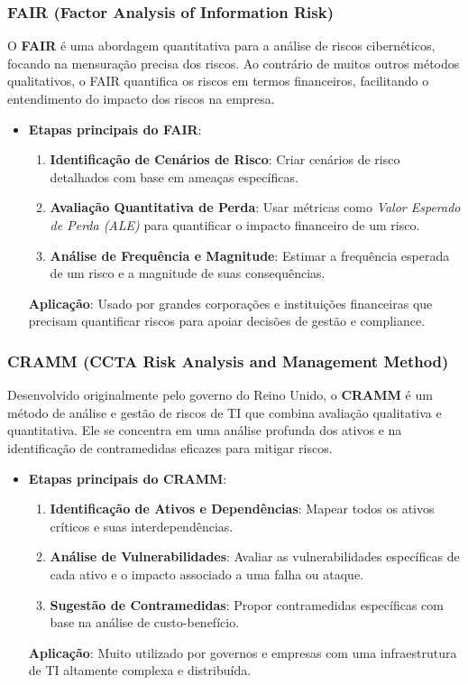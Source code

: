 \documentclass[12pt,oneside,a4paper,article]{abntex2}
\begin{document}
\subsubsection{FAIR (Factor Analysis of Information Risk)}

O \textbf{FAIR} é uma abordagem quantitativa para a análise de riscos cibernéticos, focando na mensuração precisa dos riscos. Ao contrário de muitos outros métodos qualitativos, o FAIR quantifica os riscos em termos financeiros, facilitando o entendimento do impacto dos riscos na empresa.

\begin{itemize}
    \item \textbf{Etapas principais do FAIR}:
    \begin{enumerate}
        \item \textbf{Identificação de Cenários de Risco}: Criar cenários de risco detalhados com base em ameaças específicas.
        \item \textbf{Avaliação Quantitativa de Perda}: Usar métricas como \textit{Valor Esperado de Perda (ALE)} para quantificar o impacto financeiro de um risco.
        \item \textbf{Análise de Frequência e Magnitude}: Estimar a frequência esperada de um risco e a magnitude de suas consequências.
    \end{enumerate}
    \textbf{Aplicação}: Usado por grandes corporações e instituições financeiras que precisam quantificar riscos para apoiar decisões de gestão e compliance.
\end{itemize}

\subsubsection{CRAMM (CCTA Risk Analysis and Management Method)}

Desenvolvido originalmente pelo governo do Reino Unido, o \textbf{CRAMM} é um método de análise e gestão de riscos de TI que combina avaliação qualitativa e quantitativa. Ele se concentra em uma análise profunda dos ativos e na identificação de contramedidas eficazes para mitigar riscos.

\begin{itemize}
    \item \textbf{Etapas principais do CRAMM}:
    \begin{enumerate}
        \item \textbf{Identificação de Ativos e Dependências}: Mapear todos os ativos críticos e suas interdependências.
        \item \textbf{Análise de Vulnerabilidades}: Avaliar as vulnerabilidades específicas de cada ativo e o impacto associado a uma falha ou ataque.
        \item \textbf{Sugestão de Contramedidas}: Propor contramedidas específicas com base na análise de custo-benefício.
    \end{enumerate}
    \textbf{Aplicação}: Muito utilizado por governos e empresas com uma infraestrutura de TI altamente complexa e distribuída.
\end{itemize}
\end{document}

